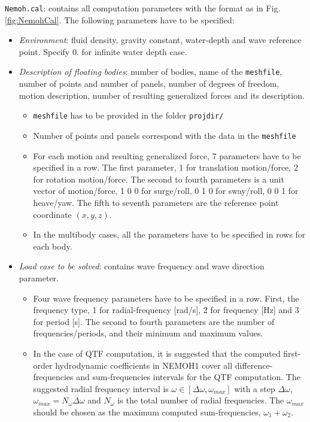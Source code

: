 \documentclass[12pt,a4paper,titlepage]{article}
\begin{document}
\texttt{Nemoh.cal}: contains all computation parameters with the format as in Fig. \ref{fig:NemohCal}. The following parameters have to be specified:
\begin{itemize}
\item \emph{Environment}: fluid density, gravity constant, water-depth and wave reference point. Specify $0.$ for infinite water depth case.
\item \emph{Description of floating bodies}: number of bodies, name of the \texttt{meshfile}, number of points and number of panels, number of degrees of freedom, motion description, number of resulting generalized forces and its description.
\begin{itemize}
\item \texttt{meshfile} has to be provided in the folder \texttt{projdir/}
\item Number of points and panels correspond with the data in the \texttt{meshfile}
\item For each motion and resulting generalized force, 7 parameters have to be specified in a row. The first parameter, 1 for translation motion/force, 2 for rotation motion/force. The second to fourth parameters is a unit vector of motion/force, 1 0 0 for surge/roll, 0 1 0 for sway/roll, 0 0 1 for heave/yaw. The fifth to seventh parameters are the reference point coordinate $(x,y,z)$.
\item In the multibody cases, all the parameters have to be specified in rows for each body.
\end{itemize}
\item \emph{Load case to be solved}: contains wave frequency and wave direction parameter.
\begin{itemize}
\item Four wave frequency parameters have to be specified in a row. First, the frequency type, 1 for radial-frequency [rad/s], 2 for frequency [Hz] and 3 for period [s]. The second to fourth parameters are the number of frequencies/periods, and their minimum and maximum values.
\item In the case of QTF computation, it is suggested that the computed first-order hydrodynamic coefficients in NEMOH1 cover all difference-frequencies and sum-frequencies intervals for the QTF computation. The suggested radial frequency interval is $\omega \in [\Delta \omega, \omega_{max}]$ with a step $\Delta \omega$, $\omega_{max}=N_{\omega}\Delta \omega$ and $N_{\omega}$ is the total number of radial frequencies. The $\omega_{max}$ should be chosen as the maximum computed sum-frequencies, $\omega_1+\omega_2$.

\end{itemize}
\end{itemize}
\end{document}
